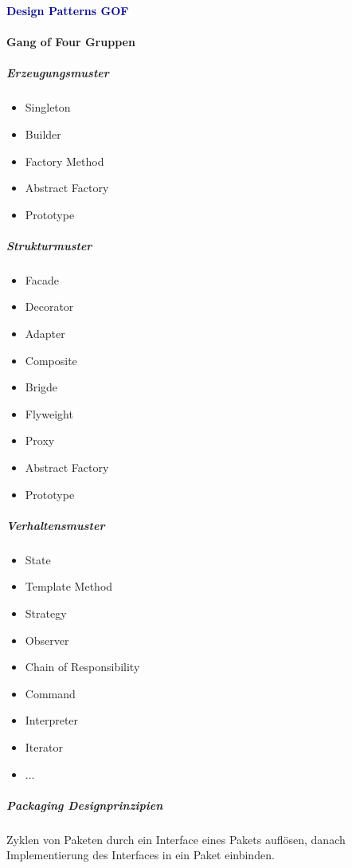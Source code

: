 \textbf{\textcolor{darkblue}{Design Patterns GOF}}~
\paragraph{Gang of Four Gruppen}

\subparagraph{Erzeugungsmuster}
\begin{itemize}
	\item Singleton
	\item Builder
	\item Factory Method
	\item Abstract Factory
	\item Prototype
\end{itemize}

\subparagraph{Strukturmuster}
\begin{itemize}
	\item Facade
	\item Decorator
	\item Adapter
	\item Composite
	\item Brigde
	\item Flyweight
	\item Proxy
	\item Abstract Factory
	\item Prototype
\end{itemize}

\subparagraph{Verhaltensmuster}
\begin{itemize}
	\item State
	\item Template Method
	\item Strategy
	\item Observer
	\item Chain of Responsibility
	\item Command
	\item Interpreter
	\item Iterator
	\item ...
\end{itemize}


\subparagraph{Packaging Designprinzipien}
Zyklen von Paketen durch ein Interface eines Pakets auflösen, 
danach Implementierung des Interfaces in ein Paket einbinden.


